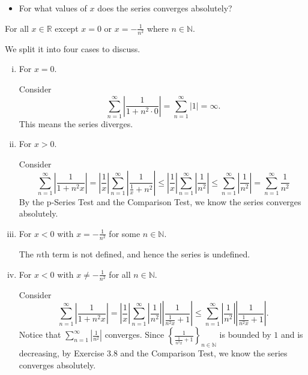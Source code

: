 \begin{Exercise}
	\begin{itemize}
		\item For what values of $x$ does the series converges absolutely?
	\end{itemize}
	\begin{answer}
		For all $x\in \mathbb{R}$ except $x=0$ or $x=-\frac{1}{n^2}$ where $n\in\mathbb{N}$.
	\end{answer}
	\begin{solution}
		We split it into four cases to discuss.
		\begin{enumerate}[i)]
			\item For $x=0$.
			
			Consider 
			$$
			\sum_{n=1}^{\infty} \left| \frac{1}{1 + n^2 \cdot 0} \right|
			= \sum_{n=1}^{\infty} \left| 1 \right| = \infty.
			$$
			This means the series diverges.
			
			\item For $x>0$.
			
			Consider
			$$
			\sum_{n=1}^{\infty} \left| \frac{1}{1 + n^2 x} \right|
			= \left| \frac{1}{x} \right| \sum_{n=1}^{\infty} \left| \frac{1}{\frac{1}{x} + n^2} \right| 
			\leq \left| \frac{1}{x} \right| \sum_{n=1}^{\infty} \left| \frac{1}{n^2} \right|
			\leq \sum_{n=1}^{\infty} \left| \frac{1}{n^2} \right|
			= \sum_{n=1}^{\infty} \frac{1}{n^2}
			$$
			By the p-Series Test and the Comparison Test, we know the series converges absolutely.
			
			\item For $x<0$ with $x = -\frac{1}{n^2}$ for some $n\in\mathbb{N}$.
			
			The $n$th term is not defined, and hence the series is undefined.
			
			\item For $x<0$ with $x \neq -\frac{1}{n^2}$ for all $n\in\mathbb{N}$.
			
			Consider 
			$$
			\sum_{n=1}^{\infty} \left| \frac{1}{1 + n^2 x} \right|
			= \left| \frac{1}{x} \right| \sum_{n=1}^{\infty} \left| \frac{1}{n^2} \right| \left| \frac{1}{\frac{1}{n^2 x} + 1} \right|
			\leq \sum_{n=1}^{\infty} \left| \frac{1}{n^2} \right| \left| \frac{1}{\frac{1}{n^2 x} + 1} \right|.
			$$
			Notice that $\sum_{n=1}^{\infty} \left| \frac{1}{n^2} \right|$ converges.
			Since $\left\{\frac{1}{\frac{1}{n^2 x} + 1} \right\}_{n\in\mathbb{N}}$ is bounded by $1$ and is decreasing, by Exercise 3.8 and the Comparison Test, we know the series converges absolutely.
		\end{enumerate}
	\end{solution}
	

\end{Exercise}
